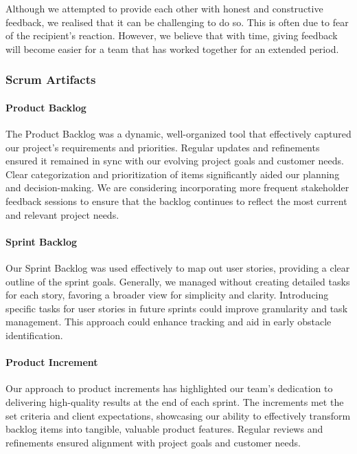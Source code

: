 Although we attempted to provide each other with honest and constructive feedback, we realised that it can be challenging to do so.
This is often due to fear of the recipient's reaction.
However, we believe that with time, giving feedback will become easier for a team that has worked together for an extended period.

\subsubsection{Scrum Artifacts}

\paragraph{Product Backlog}
The Product Backlog was a dynamic, well-organized tool that effectively captured our project's requirements and priorities.
Regular updates and refinements ensured it remained in sync with our evolving project goals and customer needs.
Clear categorization and prioritization of items significantly aided our planning and decision-making.
We are considering incorporating more frequent stakeholder feedback sessions to ensure that the backlog continues to reflect the most current and relevant project needs.

\paragraph{Sprint Backlog}
Our Sprint Backlog was used effectively to map out user stories, providing a clear outline of the sprint goals.
Generally, we managed without creating detailed tasks for each story, favoring a broader view for simplicity and clarity.
Introducing specific tasks for user stories in future sprints could improve granularity and task management.
This approach could enhance tracking and aid in early obstacle identification.

\paragraph{Product Increment}
Our approach to product increments has highlighted our team's dedication to delivering high-quality results at the end of each sprint.
The increments met the set criteria and client expectations, showcasing our ability to effectively transform backlog items into tangible, valuable product features.
Regular reviews and refinements ensured alignment with project goals and customer needs.
\clearpage

